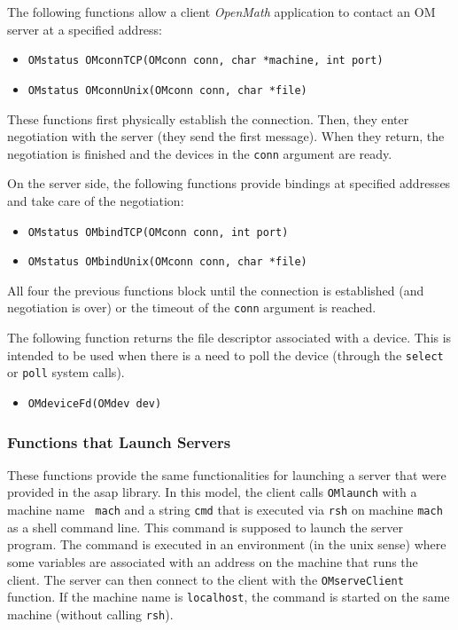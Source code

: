 \documentclass{article}
\newcommand{\OM}{{\sl OpenMath}}
\begin{document}
The following functions allow a client {\OM} application to contact an OM
server at a specified address:
\begin{itemize} 
\item \verb+OMstatus OMconnTCP(OMconn conn, char *machine, int port)+
\item \verb+OMstatus OMconnUnix(OMconn conn, char *file)+
\end{itemize} 
These functions first physically establish the connection. Then, they enter
negotiation with the server (they send the first message). When they return,
the negotiation is finished and the devices in the {\tt conn} argument are
ready. 

On the server side, the following functions provide bindings at specified
addresses and take care of the negotiation:
\begin{itemize} 
\item \verb+OMstatus OMbindTCP(OMconn conn, int port)+
\item \verb+OMstatus OMbindUnix(OMconn conn, char *file)+
\end{itemize} 

All four the previous  functions block until the connection is established
(and negotiation is over) or the timeout of the {\tt conn} argument is
reached.

The following function returns the file descriptor associated with a device.
This is intended to be used when there is a need to poll the device (through
the {\tt select} or {\tt poll} system calls).
\begin{itemize}
\item \verb+OMdeviceFd(OMdev dev)+
\end{itemize} 

\subsubsection{Functions that Launch Servers}

These functions provide the same functionalities for launching a server that
were provided in the {\sc asap} library. 
In this model, the client calls {\tt OMlaunch} with a machine name {\tt
mach} and a string {\tt cmd} that is executed via {\tt rsh} on machine
{\tt mach} as a shell command line. This command is supposed to launch the
server program. The command is executed in an environment (in the {\sc unix}
sense) where some variables are associated with an address on the machine that
runs the client. The server can then connect to the client with the 
{\tt OMserveClient} function.
If the machine name is {\tt localhost}, the command is started on the
same machine (without calling {\tt rsh}).
\end{document}
